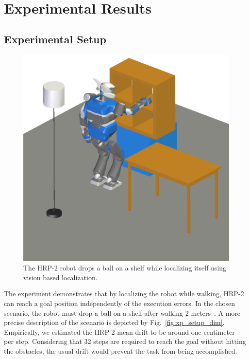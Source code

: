\section{Experimental Results}\label{sec:results}

\subsection{Experimental Setup}\label{sec:xp_setup}
%
\begin{figure}[ht!] %
  \begin{center}
    \includegraphics[width=\linewidth]{images/trajectory-8.png}
  \end{center}
  \caption{The HRP-2 robot drops a ball on a shelf while localizing
    itself using vision based localization. \label{fig:xp_setup_screenshot}}
\end{figure}
%
The experiment demonstrates that by localizing the robot while walking, HRP-2 can reach a goal position independently of the execution errors. In the chosen scenario, the robot must drop a ball
on a shelf after walking 2 meters~. A more precise description of the scenario is depicted by Fig.~\ref{fig:xp_setup_dim}. Empirically, we estimated the
HRP-2 mean drift to be around one centimeter~ per step. Considering that 32 steps are required to reach the goal without hitting the obstacles, the usual drift would prevent the task from being accomplished.
